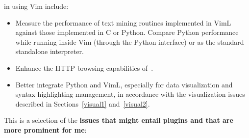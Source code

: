 \documentclass{article}
\begin{document}
 in using Vim include:
\begin{itemize}
  \item Measure the performance of text mining routines implemented in VimL against those implemented in C or Python. Compare Python performance while running inside Vim (through the Python interface) or as the standard standalone interpreter.
  \item Enhance the HTTP browsing capabilities of~\cite{vimrc}.
  \item Better integrate Python and VimL, especially for data visualization
    and syntax highlighting management,
    in accordance with the visualization issues described in
    Sections~\ref{visual1} and~\ref{visual2}.
\end{itemize}

\noindent This is a selection of the {\bf issues that might entail
plugins and that are more prominent for me}:
\end{document}
